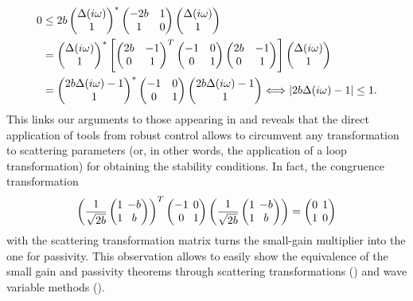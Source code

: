 \begin{align*}
0&\leq  2b\pmatr{\Delta(\iw)\\ 1 }^*\pmatr{-2b &1\\1 &0}\pmatr{\Delta(\iw)\\1} \\\nonumber  %
&=\pmatr{\Delta(\iw)\\1}^*\left[\pmatr{2b&-1\\0&1}^T\pmatr{-1 &0\\0 &1}\pmatr{2b&-1\\0&1}\right]\pmatr{\Delta(\iw)\\1}\\\nonumber
&=\pmatr{2b\Delta(\iw) - 1\\ 1 }^*\pmatr{-1 &0\\0 &1}\pmatr{2b\Delta(\iw) - 1\\ 1 } \Longleftrightarrow |2b\Delta(\iw)-1| \leq 1.
\end{align*}
This links our arguments to those appearing in \cite{colgate2,colgate3} and reveals that the direct application of 
tools from robust control allows to circumvent any transformation to scattering parameters (or, in other words, 
the application of a loop transformation) for obtaining the stability conditions. In fact, the congruence transformation
\begin{equation*}\arraycolsep0.5ex
\left(\frac{1}{\sqrt{2b}}\pmatr{1 &-b\\1&b}\right)^T\pmatr{-1 &0\\0
&1}
\left(\frac{1}{\sqrt{2b}}\pmatr{1 &-b\\1 &b}\right) = \pmatr{0&1 \\
1 &0}
\end{equation*}
with the scattering transformation matrix turns the small-gain multiplier into the one for passivity. This observation 
allows to easily show the equivalence of the small gain and passivity theorems through scattering transformations 
(\cite{andersonspong}) and wave variable methods (\cite{nieslotine,nieslotine2}).

